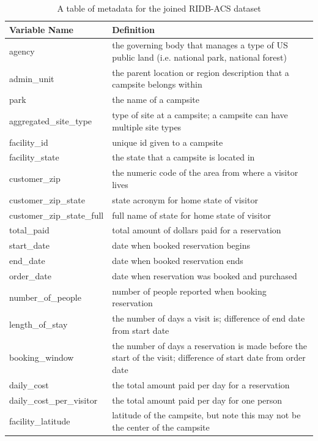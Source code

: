\documentclass[
  11 pt,
  openany]{book}
\begin{document}
\begin{table}

\caption{\label{tab:metadata-tab}A table of metadata for the joined RIDB-ACS dataset}
\begin{tabu} to 
\hline
Variable Name & Definition\\
\hline
agency & the governing body that manages a type of US public land (i.e. national park, national forest)\\
\hline
admin\_unit & the parent location or region description that a campsite belongs within\\
\hline
park & the name of a campsite\\
\hline
aggregated\_site\_type & type of site at a campsite; a campsite can have multiple site types\\
\hline
facility\_id & unique id given to a campsite\\
\hline
facility\_state & the state that a campsite is located in\\
\hline
customer\_zip & the numeric code of the area from where a visitor lives\\
\hline
customer\_zip\_state & state acronym for home state of visitor\\
\hline
customer\_zip\_state\_full & full name of state for home state of visitor\\
\hline
total\_paid & total amount of dollars paid for a reservation\\
\hline
start\_date & date when booked reservation begins\\
\hline
end\_date & date when booked reservation ends\\
\hline
order\_date & date when reservation was booked and purchased\\
\hline
number\_of\_people & number of people reported when booking reservation\\
\hline
length\_of\_stay & the number of days a visit is; difference of end date from start date\\
\hline
booking\_window & the number of days a reservation is made before the start of the visit; difference of start date from order date\\
\hline
daily\_cost & the total amount paid per day for a reservation\\
\hline
daily\_cost\_per\_visitor & the total amount paid per day for one person\\
\hline
facility\_latitude & latitude of the campsite, but note this may not be the center of the campsite\\

\end{tabu}
\end{table}
\end{document}
